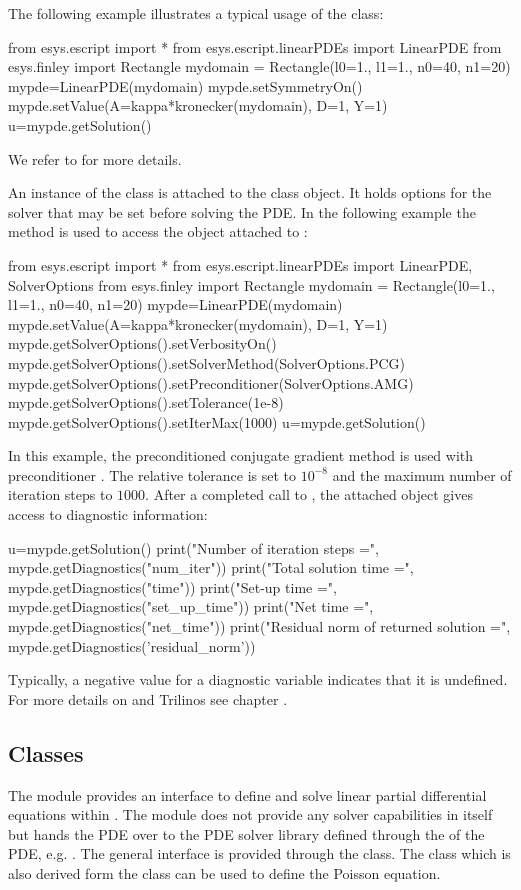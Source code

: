 The following example illustrates a typical usage of the \LinearPDE class:
\begin{python}
  from esys.escript import *
  from esys.escript.linearPDEs import LinearPDE
  from esys.finley import Rectangle
  mydomain = Rectangle(l0=1., l1=1., n0=40, n1=20)
  mypde=LinearPDE(mydomain)
  mypde.setSymmetryOn()
  mypde.setValue(A=kappa*kronecker(mydomain), D=1, Y=1)
  u=mypde.getSolution()
\end{python}
We refer to  for more details.

An instance of the \SolverOptions class is attached to the \LinearPDE class
object. It holds options for the solver that may be set before solving the PDE.
In the following example the  method is used to
access the \SolverOptions object attached to :
\begin{python}
  from esys.escript import *
  from esys.escript.linearPDEs import LinearPDE, SolverOptions
  from esys.finley import Rectangle
  mydomain = Rectangle(l0=1., l1=1., n0=40, n1=20)
  mypde=LinearPDE(mydomain)
  mypde.setValue(A=kappa*kronecker(mydomain), D=1, Y=1)
  mypde.getSolverOptions().setVerbosityOn()
  mypde.getSolverOptions().setSolverMethod(SolverOptions.PCG)
  mypde.getSolverOptions().setPreconditioner(SolverOptions.AMG)
  mypde.getSolverOptions().setTolerance(1e-8)
  mypde.getSolverOptions().setIterMax(1000)
  u=mypde.getSolution()
\end{python}
In this example, the preconditioned conjugate gradient method \PCG is used
with preconditioner \AMG. The relative tolerance is set to $10^{-8}$ and
the maximum number of iteration steps to $1000$.
After a completed call to , the attached \SolverOptions
object gives access to diagnostic information:
\begin{python}
  u=mypde.getSolution()
  print("Number of iteration steps =", mypde.getDiagnostics("num_iter"))
  print("Total solution time =", mypde.getDiagnostics("time"))
  print("Set-up time =", mypde.getDiagnostics("set_up_time"))
  print("Net time =", mypde.getDiagnostics("net_time"))
  print("Residual norm of returned solution =", 
      mypde.getDiagnostics('residual_norm'))
\end{python}
Typically, a negative value for a diagnostic variable indicates that it is
undefined.  For more details on \SolverOptions and Trilinos see chapter .

\subsection{Classes}
The module \linearPDEs provides an interface to define and solve linear partial
differential equations within \escript. The module \linearPDEs does not
provide any solver capabilities in itself but hands the PDE over to the PDE
solver library defined through the \Domain of the PDE, e.g. \finley.
The general interface is provided through the \LinearPDE class. The \Poisson
class which is also derived form the \LinearPDE class can be used to define
the Poisson equation.

